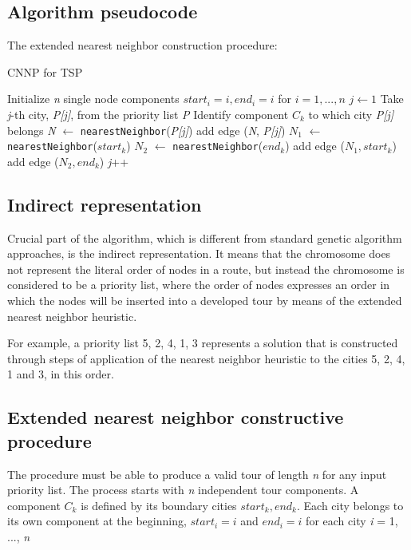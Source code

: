 \documentclass[twoside]{ctuthesis}
\theoremstyle{plain}
\theoremstyle{definition}
\theoremstyle{note}
\begin{document}
\subsection{Algorithm pseudocode}
 The extended nearest neighbor construction procedure:
\begin{algorithm}
 	\caption{CNNP for TSP}\label{alg:cap}
\begin{algorithmic}[1]
\State Initialize \emph{n} single node components \emph{$ start_i = i, end_i = i $} for \emph{$ i = 1, ..., n $}
\State $j \gets 1$
\Do
\State Take \emph{j}-th city, \emph{P[j]}, from the priority list \emph{P}
\State Identify component \emph{$ C_k $} to which city \emph{P[j]} belongs
\State \emph{N} $\gets$ {\tt nearestNeighbor}(\emph{P[j]})
\State add edge (\emph{N}, \emph{P[j]})
\Else
\State \emph{$ N_1 $} $\gets$ {\tt nearestNeighbor}(\emph{$ start_k $})
\State \emph{$ N_2 $} $\gets$ {\tt nearestNeighbor}(\emph{$ end_k $})
\State add edge (\emph{$ N_1, start_k $})
\Else
\State add edge (\emph{$ N_2, end_k $})
\EndIf
\EndIf
\State \emph{j}++

\end{algorithmic}
\end{algorithm}


\subsection{Indirect representation}
Crucial part of the algorithm, which is different from standard genetic algorithm approaches, is the indirect representation. It means that the chromosome does not represent the literal order of nodes in a route, but instead the chromosome is considered to be a priority list, where the order of nodes expresses an order in which the nodes will be inserted into a developed tour by means of the extended nearest neighbor heuristic.

For example, a priority
list {5, 2, 4, 1, 3} represents a solution that is constructed
through steps of application of the nearest neighbor heuristic
to the cities 5, 2, 4, 1 and 3, in this order.

\subsection{Extended nearest neighbor constructive procedure}
The procedure must be able to produce a valid tour of length \emph{n} for any input priority list.
The process starts with \emph{n} independent tour components. A component \emph{$ C_k $} is defined by its boundary cities {\emph{$ start_k, end_k $}}. Each city belongs to its own component at the beginning, \emph{$ start_i = i $} and \emph{$ end_i = i  $} for each city \emph{i} = 1, ..., \emph{n}
\end{document}
